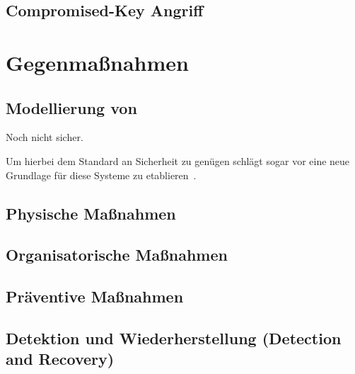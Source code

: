 \documentclass[final,bibliography=totocnumbered]{include/sikseminar}
\begin{document}
\subsection{Compromised-Key Angriff}\label{subsec:key}


\section{Gegenmaßnahmen}\label{sec:gegenmassnahmen}




\subsection{Modellierung von }\label{subsec:modellierung}
Noch nicht sicher.

Um hierbei dem Standard an Sicherheit zu genügen schlägt \citeauthor{Lee08} sogar vor eine neue Grundlage für diese Systeme zu etablieren~\cite{Lee08}.

\subsection{Physische Maßnahmen}\label{subsec:physisch}

\subsection{Organisatorische Maßnahmen}\label{subsec:orga}

\subsection{Präventive Maßnahmen}\label{subsec:präventiv}

\subsection{Detektion und Wiederherstellung (Detection and Recovery)}\label{subsec:detektion}
\end{document}
